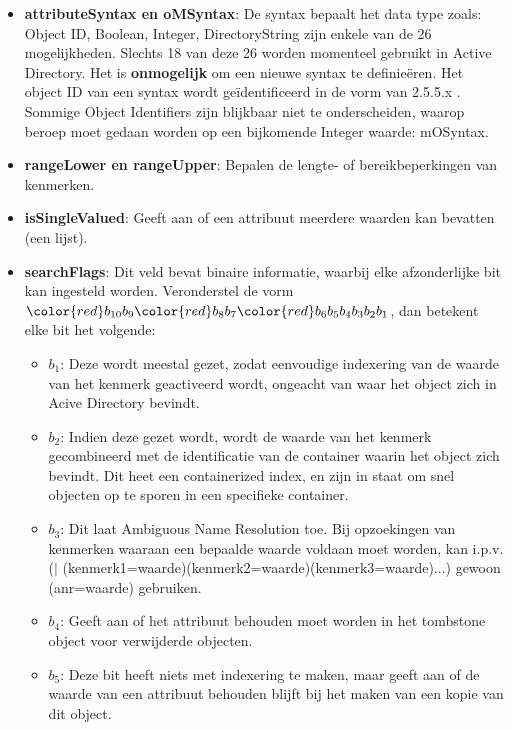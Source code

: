 \documentclass{report}
\begin{document}
\begin{enumerate}
		 { 
			\begin{itemize}
				\item \textbf{attributeSyntax en oMSyntax}: De syntax bepaalt het data type zoals: Object ID, Boolean, Integer, DirectoryString zijn enkele van de 26 mogelijkheden. Slechts 18 van deze 26 worden momenteel gebruikt in Active Directory. Het is \textbf{onmogelijk} om een nieuwe syntax te definieëren. Het object ID van een syntax wordt geïdentificeerd in de vorm van 2.5.5.x . Sommige Object Identifiers zijn blijkbaar niet te onderscheiden, waarop beroep moet gedaan worden op een bijkomende Integer waarde: mOSyntax.
				\item \textbf{rangeLower en rangeUpper}: Bepalen de lengte- of bereikbeperkingen van kenmerken.
				\item \textbf{isSingleValued}: Geeft aan of een attribuut meerdere waarden kan bevatten (een lijst).
				\item \textbf{searchFlags}: Dit veld bevat binaire informatie, waarbij elke afzonderlijke bit kan ingesteld worden. Veronderstel de vorm ${\color{red}b_{10}}b_9{\color{red}b_8}b_7{\color{red}b_6b_5b_4b_3b_2b_1}$, dan betekent elke bit het volgende:
				\begin{itemize}
					\item \textbf{$b_1$}: Deze wordt meestal gezet, zodat eenvoudige indexering van de waarde van het kenmerk geactiveerd wordt, ongeacht van waar het object zich in Acive Directory bevindt.
					\item \textbf{$b_2$}: Indien deze gezet wordt, wordt de waarde van het kenmerk gecombineerd met de identificatie van de container waarin het object zich bevindt. Dit heet een containerized index, en zijn in staat om snel objecten op te sporen in een specifieke container.
					\item \textbf{$b_3$}: Dit laat Ambiguous Name Resolution toe. Bij opzoekingen van kenmerken waaraan een bepaalde waarde voldaan moet worden, kan i.p.v. \\ ($\mid$ (kenmerk1=waarde)(kenmerk2=waarde)(kenmerk3=waarde)...) gewoon (anr=waarde) gebruiken. 
					\item \textbf{$b_4$}: Geeft aan of het attribuut behouden moet worden in het tombstone object voor verwijderde objecten.
					\item \textbf{$b_5$}: Deze bit heeft niets met indexering te maken, maar geeft aan of de waarde van een attribuut behouden blijft bij het maken van een kopie van dit object.

\end{itemize}
\end{itemize}}
\end{enumerate}
\end{document}
